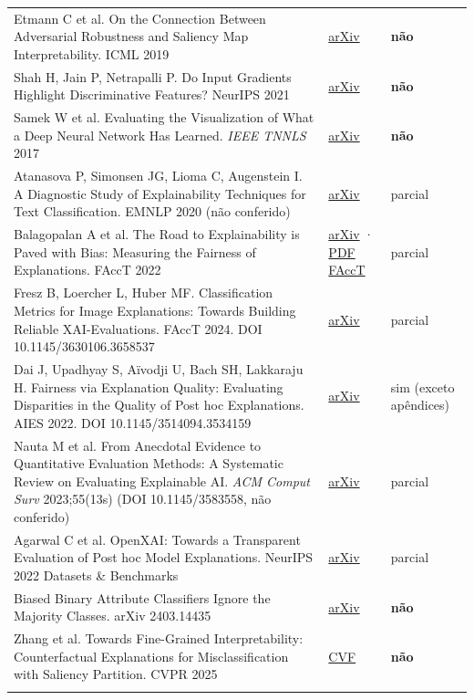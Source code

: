 \documentclass[11pt,a4paper]{article}
\begin{document}
{\begin{xltabular}{\linewidth}{>{\raggedright\arraybackslash}X>{\raggedright\arraybackslash}X>{\raggedright\arraybackslash}X}
Etmann C et al. On the Connection Between Adversarial Robustness and Saliency Map Interpretability. ICML 2019 & \href{https://arxiv.org/abs/1905.04172}{arXiv} & \textbf{não} \\ \addlinespace[1pt]
Shah H, Jain P, Netrapalli P. Do Input Gradients Highlight Discriminative Features? NeurIPS 2021 & \href{https://arxiv.org/abs/2102.12781}{arXiv} & \textbf{não} \\ \addlinespace[1pt]
Samek W et al. Evaluating the Visualization of What a Deep Neural Network Has Learned. \textit{IEEE TNNLS} 2017 & \href{https://arxiv.org/abs/1509.06321}{arXiv} & \textbf{não} \\ \addlinespace[1pt]
Atanasova P, Simonsen JG, Lioma C, Augenstein I. A Diagnostic Study of Explainability Techniques for Text Classification. EMNLP 2020 (não conferido) & \href{https://arxiv.org/abs/2009.13295}{arXiv} & parcial \\ \addlinespace[1pt]
Balagopalan A et al. The Road to Explainability is Paved with Bias: Measuring the Fairness of Explanations. FAccT 2022 & \href{https://arxiv.org/abs/2205.03295}{arXiv} · \href{https://facctconference.org/static/pdfs_2022/facct22-3533179.pdf}{PDF FAccT} & parcial \\ \addlinespace[1pt]
Fresz B, Loercher L, Huber MF. Classification Metrics for Image Explanations: Towards Building Reliable XAI-Evaluations. FAccT 2024. DOI 10.1145/3630106.3658537 & \href{https://arxiv.org/abs/2406.05068}{arXiv} & parcial \\ \addlinespace[1pt]
Dai J, Upadhyay S, Aïvodji U, Bach SH, Lakkaraju H. Fairness via Explanation Quality: Evaluating Disparities in the Quality of Post hoc Explanations. AIES 2022. DOI 10.1145/3514094.3534159 & \href{https://arxiv.org/abs/2205.07277}{arXiv} & sim (exceto apêndices) \\ \addlinespace[1pt]
Nauta M et al. From Anecdotal Evidence to Quantitative Evaluation Methods: A Systematic Review on Evaluating Explainable AI. \textit{ACM Comput Surv} 2023;55(13s) (DOI 10.1145/3583558, não conferido) & \href{https://arxiv.org/abs/2201.08164}{arXiv} & parcial \\ \addlinespace[1pt]
Agarwal C et al. OpenXAI: Towards a Transparent Evaluation of Post hoc Model Explanations. NeurIPS 2022 Datasets \& Benchmarks & \href{https://arxiv.org/abs/2206.11104}{arXiv} & parcial \\ \addlinespace[1pt]
Biased Binary Attribute Classifiers Ignore the Majority Classes. arXiv 2403.14435 & \href{https://arxiv.org/html/2403.14435}{arXiv} & \textbf{não} \\ \addlinespace[1pt]
Zhang et al. Towards Fine-Grained Interpretability: Counterfactual Explanations for Misclassification with Saliency Partition. CVPR 2025 & \href{https://openaccess.thecvf.com/content/CVPR2025/papers/Zhang_Towards_Fine-Grained_Interpretability_Counterfactual_Explanations_for_Misclassification_with_Saliency_Partition_CVPR_2025_paper.pdf}{CVF} & \textbf{não} \\ \addlinespace[1pt]
\bottomrule
\end{xltabular}}
\end{document}

